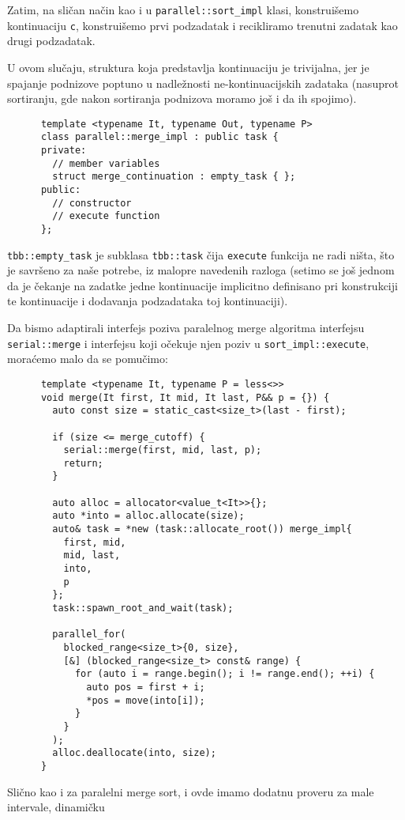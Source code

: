 \documentclass[a4paper,11pt]{article}
\begin{document}
    Zatim, na sličan način kao i u \verb|parallel::sort_impl| klasi, konstruišemo kontinuaciju \verb|c|,
    konstruišemo prvi podzadatak i recikliramo trenutni zadatak kao drugi podzadatak.\par
    U ovom slučaju, struktura
    koja predstavlja kontinuaciju je trivijalna, jer je spajanje podnizove poptuno u nadležnosti ne-kontinuacijskih
    zadataka (nasuprot sortiranju, gde nakon sortiranja podnizova moramo još i da ih spojimo).
    \begin{verbatim}
      template <typename It, typename Out, typename P>
      class parallel::merge_impl : public task {
      private:
        // member variables
        struct merge_continuation : empty_task { };
      public:
        // constructor
        // execute function
      };
    \end{verbatim}
    \verb|tbb::empty_task| je subklasa \verb|tbb::task| čija \verb|execute| funkcija ne radi ništa, što
    je savršeno za naše potrebe, iz malopre navedenih razloga (setimo se još jednom da je čekanje na zadatke
    jedne kontinuacije implicitno definisano pri konstrukciji te kontinuacije i dodavanja podzadataka toj kontinuaciji).\par
    Da bismo adaptirali interfejs poziva paralelnog merge algoritma interfejsu \verb|serial::merge| i interfejsu
    koji očekuje njen poziv u \verb|sort_impl::execute|, moraćemo malo da se pomučimo:
    \begin{verbatim}
      template <typename It, typename P = less<>>
      void merge(It first, It mid, It last, P&& p = {}) {
        auto const size = static_cast<size_t>(last - first);

        if (size <= merge_cutoff) {
          serial::merge(first, mid, last, p);
          return;
        }

        auto alloc = allocator<value_t<It>>{};
        auto *into = alloc.allocate(size);
        auto& task = *new (task::allocate_root()) merge_impl{
          first, mid,
          mid, last,
          into, 
          p
        };
        task::spawn_root_and_wait(task);

        parallel_for(
          blocked_range<size_t>{0, size},
          [&] (blocked_range<size_t> const& range) {
            for (auto i = range.begin(); i != range.end(); ++i) {
              auto pos = first + i;
              *pos = move(into[i]);
            }
          }
        );
        alloc.deallocate(into, size);
      }
    \end{verbatim}
    Slično kao i za paralelni merge sort, i ovde imamo dodatnu proveru za male intervale, dinamičku
\end{document}
